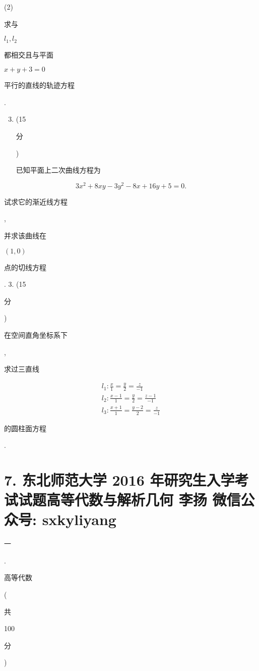 \documentclass[10pt]{article}
\begin{document}
(2) \begin{CJK}{UTF8}{mj}求与\end{CJK} $l_{1}, l_{2}$ \begin{CJK}{UTF8}{mj}都相交且与平面\end{CJK} $x+y+3=0$ \begin{CJK}{UTF8}{mj}平行的直线的轨迹方程\end{CJK}.

\begin{enumerate}
  \setcounter{enumi}{2}
  \item (15 \begin{CJK}{UTF8}{mj}分\end{CJK}) \begin{CJK}{UTF8}{mj}已知平面上二次曲线方程为\end{CJK}
\end{enumerate}
$$
3 x^{2}+8 x y-3 y^{2}-8 x+16 y+5=0 .
$$
\begin{CJK}{UTF8}{mj}试求它的渐近线方程\end{CJK}, \begin{CJK}{UTF8}{mj}并求该曲线在\end{CJK} $(1,0)$ \begin{CJK}{UTF8}{mj}点的切线方程\end{CJK}. 3. (15 \begin{CJK}{UTF8}{mj}分\end{CJK}) \begin{CJK}{UTF8}{mj}在空间直角坐标系下\end{CJK}, \begin{CJK}{UTF8}{mj}求过三直线\end{CJK}
$$
\begin{gathered}
l_{1}: \frac{x}{1}=\frac{y}{2}=\frac{z}{-1} \\
l_{2}: \frac{x-1}{1}=\frac{y}{2}=\frac{z-1}{-1} \\
l_{3}: \frac{x+1}{1}=\frac{y-2}{2}=\frac{z}{-1}
\end{gathered}
$$
\begin{CJK}{UTF8}{mj}的圆柱面方程\end{CJK}.

\section{7. 东北师范大学 2016 年研究生入学考试试题高等代数与解析几何 
 李扬 
 微信公众号: sxkyliyang}
\begin{CJK}{UTF8}{mj}一\end{CJK}. \begin{CJK}{UTF8}{mj}高等代数\end{CJK} (\begin{CJK}{UTF8}{mj}共\end{CJK} 100 \begin{CJK}{UTF8}{mj}分\end{CJK})
\end{document}
